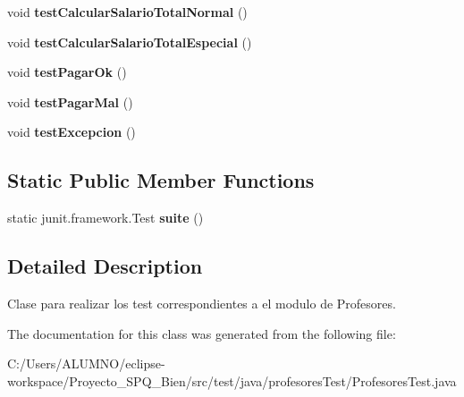 \begin{DoxyCompactItemize}
\mbox{\label{classprofesores_test_1_1_profesores_test_ade3387632c62f839f713a1d78136647b}} 
void {\bfseries test\+Calcular\+Salario\+Total\+Normal} ()
\item 
\mbox{\label{classprofesores_test_1_1_profesores_test_afcd36970fc5728255b6636ed3d674bc0}} 
void {\bfseries test\+Calcular\+Salario\+Total\+Especial} ()
\item 
\mbox{\label{classprofesores_test_1_1_profesores_test_a211a75f76ffa2297e658d62067a13513}} 
void {\bfseries test\+Pagar\+Ok} ()
\item 
\mbox{\label{classprofesores_test_1_1_profesores_test_a8d0ae1f4f972f09595ccd13330b890d4}} 
void {\bfseries test\+Pagar\+Mal} ()
\item 
\mbox{\label{classprofesores_test_1_1_profesores_test_ae17f7fdffb6992591e173eb07c98f75f}} 
void {\bfseries test\+Excepcion} ()
\end{DoxyCompactItemize}
\subsection*{Static Public Member Functions}
\begin{DoxyCompactItemize}
\item 
\mbox{\label{classprofesores_test_1_1_profesores_test_aa96a90b4c68a6ff1507da2291fff7246}} 
static junit.\+framework.\+Test {\bfseries suite} ()
\end{DoxyCompactItemize}


\subsection{Detailed Description}
Clase para realizar los test correspondientes a el modulo de Profesores. 

The documentation for this class was generated from the following file\+:\begin{DoxyCompactItemize}
\item 
C\+:/\+Users/\+A\+L\+U\+M\+N\+O/eclipse-\/workspace/\+Proyecto\+\_\+\+S\+P\+Q\+\_\+Bien/src/test/java/profesores\+Test/Profesores\+Test.\+java\end{DoxyCompactItemize}
